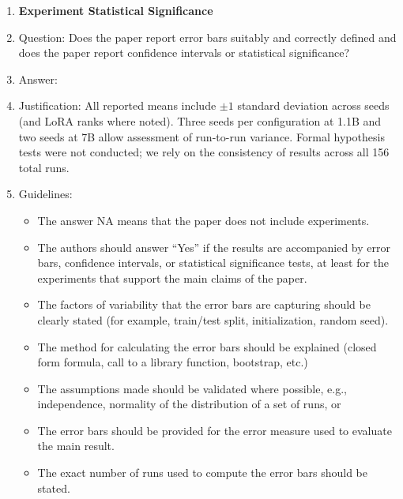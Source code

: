 \documentclass{article}
\begin{document}
\begin{enumerate}
\item {\bf Experiment Statistical Significance}
\item[] Question: Does the paper report error bars suitably and correctly defined and does the paper report confidence intervals or statistical significance?
\item[] Answer: \answerYes{}
\item[] Justification: All reported means include $\pm 1$ standard deviation across seeds (and LoRA ranks where noted). Three seeds per configuration at 1.1B and two seeds at 7B allow assessment of run-to-run variance. Formal hypothesis tests were not conducted; we rely on the consistency of results across all 156 total runs.
\item[] Guidelines:
\begin{itemize}
    \item The answer NA means that the paper does not include experiments.
    \item The authors should answer ``Yes'' if the results are accompanied by error bars, confidence intervals, or statistical significance tests, at least for the experiments that support the main claims of the paper.
    \item The factors of variability that the error bars are capturing should be clearly stated (for example, train/test split, initialization, random seed).
    \item The method for calculating the error bars should be explained (closed form formula, call to a library function, bootstrap, etc.)
    \item The assumptions made should be validated where possible, e.g., independence, normality of the distribution of a set of runs, or
    \item The error bars should be provided for the error measure used to evaluate the main result.
    \item The exact number of runs used to compute the error bars should be stated.
\end{itemize}


\end{enumerate}
\end{document}
